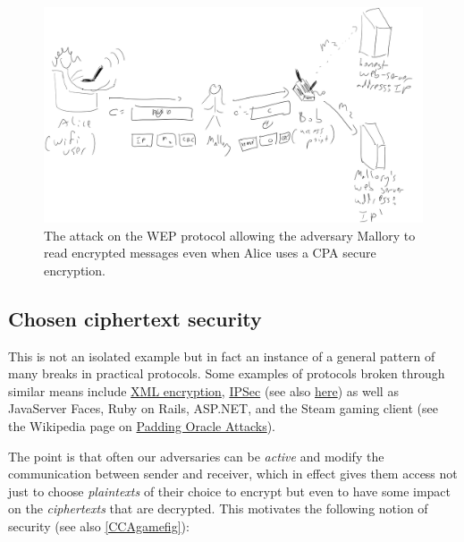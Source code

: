 \begin{figure}
\centering
\includegraphics[width=\textwidth, height=0.25\paperheight, keepaspectratio]{../figure/wep-attack.jpg}
\caption{The attack on the WEP protocol allowing the adversary Mallory
to read encrypted messages even when Alice uses a CPA secure
encryption.}
\label{WEPattackfig}
\end{figure}

\subsection{Chosen ciphertext
security}\label{Chosen-ciphertext-security}

This is not an isolated example but in fact an instance of a general
pattern of many breaks in practical protocols. Some examples of
protocols broken through similar means include
\href{http://www.nds.rub.de/media/nds/veroeffentlichungen/2011/10/22/HowToBreakXMLenc.pdf}{XML
encryption},
\href{https://www.cs.columbia.edu/~smb/papers/badesp.pdf}{IPSec} (see
also \href{https://eprint.iacr.org/2005/416}{here}) as well as
JavaServer Faces, Ruby on Rails, ASP.NET, and the Steam gaming client
(see the Wikipedia page on \href{https://goo.gl/b5aKYg}{Padding Oracle
Attacks}).

The point is that often our adversaries can be \emph{active} and modify
the communication between sender and receiver, which in effect gives
them access not just to choose \emph{plaintexts} of their choice to
encrypt but even to have some impact on the \emph{ciphertexts} that are
decrypted. This motivates the following notion of security (see also
\cref{CCAgamefig}):

